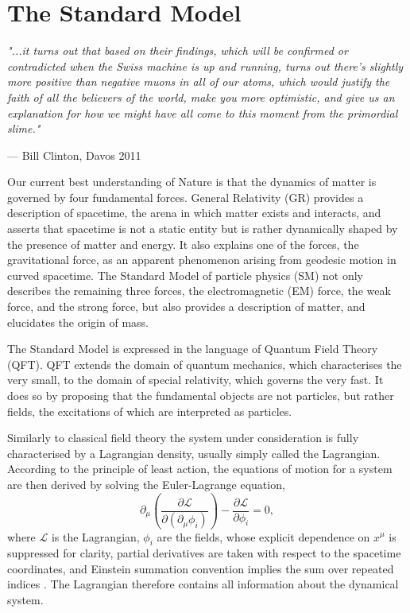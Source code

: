 \chapter{The Standard Model}

\textit{"...it turns out that based on their findings, which will be confirmed
or contradicted when the Swiss machine is up and running, turns out there's
slightly more positive than negative muons in all of our atoms, which would
justify the faith of all the believers of the world, make you more
optimistic, and give us an explanation for how we might have all come to this
moment from the primordial slime."}
\vspace{5mm}
\begin{flushright}
--- Bill Clinton, Davos 2011
\end{flushright}

\thispagestyle{empty}
\newpage

\noindent
Our current best understanding of Nature is that the dynamics of matter is governed
by four fundamental forces. General Relativity (GR) provides a
description of spacetime, the arena in which matter exists and interacts, and asserts
that spacetime is not a static entity but is rather dynamically shaped by the presence
of matter and energy. It also explains one of the forces, the gravitational force, as an apparent
phenomenon arising from geodesic motion in curved spacetime. The Standard Model of particle physics
(SM) not only describes the remaining three forces, the electromagnetic (EM) force,
the weak force, and the strong force, but also provides a description of matter, and 
elucidates the origin of mass.

The Standard Model is expressed in the language of Quantum Field Theory (QFT). QFT 
extends the domain of quantum mechanics, which characterises the very small, to
the domain of special relativity, which governs the very fast. It does so by
proposing that the fundamental objects are not particles, but rather fields, the
excitations of which are interpreted as particles.

Similarly to classical field theory the system under consideration is fully characterised
by a Lagrangian density, usually simply called the Lagrangian. According to
the principle of least action, the equations of motion for a system are then derived
by solving the Euler-Lagrange equation,
\begin{equation}
\partial_\mu \left(\frac{\partial \mathcal{L}}{\partial(\partial_\mu \phi_i)}\right)
- \frac{\partial{\mathcal{L}}}{\partial \phi_i} = 0,
\end{equation}
where $\mathcal{L}$ is the Lagrangian, $\phi_i$ are the fields, whose explicit dependence
on $x^\mu$ is suppressed for clarity, partial derivatives
are taken with respect to the spacetime coordinates, and Einstein summation convention implies
the sum over repeated indices \cite{Thomson:2013zua}. The Lagrangian therefore contains all
information about the dynamical system. 

